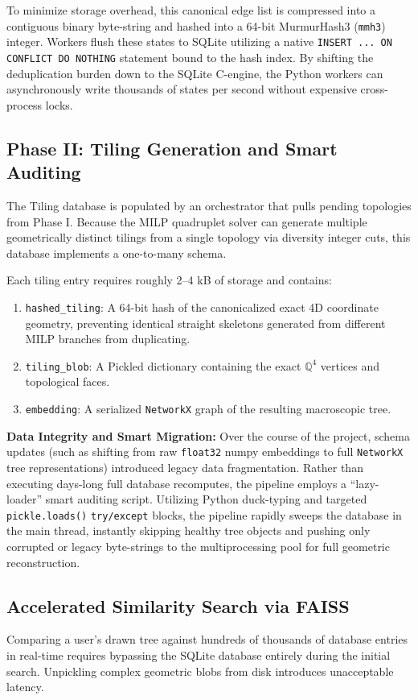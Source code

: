 \documentclass[11pt]{article}
\begin{document}
To minimize storage overhead, this canonical edge list is compressed into a contiguous binary byte-string and hashed into a 64-bit MurmurHash3 (\texttt{mmh3}) integer. Workers flush these states to SQLite utilizing a native \texttt{INSERT ... ON CONFLICT DO NOTHING} statement bound to the hash index. By shifting the deduplication burden down to the SQLite C-engine, the Python workers can asynchronously write thousands of states per second without expensive cross-process locks.

\subsection{Phase II: Tiling Generation and Smart Auditing}
The Tiling database is populated by an orchestrator that pulls pending topologies from Phase I. Because the MILP quadruplet solver can generate multiple geometrically distinct tilings from a single topology via diversity integer cuts, this database implements a one-to-many schema.

Each tiling entry requires roughly 2--4 kB of storage and contains:
\begin{enumerate}
    \item \texttt{hashed\_tiling}: A 64-bit hash of the canonicalized exact 4D coordinate geometry, preventing identical straight skeletons generated from different MILP branches from duplicating.
    \item \texttt{tiling\_blob}: A Pickled dictionary containing the exact $\mathbb{Q}^4$ vertices and topological faces.
    \item \texttt{embedding}: A serialized \texttt{NetworkX} graph of the resulting macroscopic tree.
\end{enumerate}

\textbf{Data Integrity and Smart Migration:} Over the course of the project, schema updates (such as shifting from raw \texttt{float32} numpy embeddings to full \texttt{NetworkX} tree representations) introduced legacy data fragmentation. Rather than executing days-long full database recomputes, the pipeline employs a ``lazy-loader'' smart auditing script. Utilizing Python duck-typing and targeted \texttt{pickle.loads()} \texttt{try/except} blocks, the pipeline rapidly sweeps the database in the main thread, instantly skipping healthy tree objects and pushing only corrupted or legacy byte-strings to the multiprocessing pool for full geometric reconstruction. 

\subsection{Accelerated Similarity Search via FAISS}
Comparing a user's drawn tree against hundreds of thousands of database entries in real-time requires bypassing the SQLite database entirely during the initial search. Unpickling complex geometric blobs from disk introduces unacceptable latency. 
\end{document}

